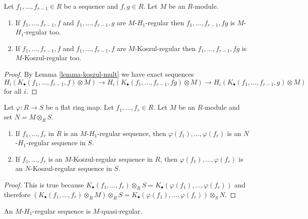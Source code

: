 \begin{lemma}
\label{lemma-mult-koszul-regular}
Let $f_1, \ldots, f_{r - 1} \in R$ be a sequence and $f, g \in R$.
Let $M$ be an $R$-module.
\begin{enumerate}
\item If $f_1, \ldots, f_{r - 1}, f$ and $f_1, \ldots, f_{r - 1}, g$
are $M$-$H_1$-regular then $f_1, \ldots, f_{r - 1}, fg$ is
$M$-$H_1$-regular too.
\item If $f_1, \ldots, f_{r - 1}, f$ and $f_1, \ldots, f_{r - 1}, f$ are
$M$-Koszul-regular then $f_1, \ldots, f_{r - 1}, fg$ is $M$-Koszul-regular
too.
\end{enumerate}
\end{lemma}

\begin{proof}
By
Lemma \ref{lemma-koszul-mult}
we have exact sequences
$$
H_i(K_\bullet(f_1, \ldots, f_{r - 1}, f) \otimes M) \to
H_i(K_\bullet(f_1, \ldots, f_{r - 1}, fg) \otimes M) \to
H_i(K_\bullet(f_1, \ldots, f_{r - 1}, g) \otimes M)
$$
for all $i$.
\end{proof}

\begin{lemma}
\label{lemma-koszul-regular-flat-base-change}
Let $\varphi : R \to S$ be a flat ring map. Let $f_1, \ldots, f_r \in R$.
Let $M$ be an $R$-module and set $N = M \otimes_R S$.
\begin{enumerate}
\item If $f_1, \ldots, f_r$ in $R$ is an $M$-$H_1$-regular sequence, then
$\varphi(f_1), \ldots, \varphi(f_r)$ is an $N$-$H_1$-regular
sequence in $S$.
\item If $f_1, \ldots, f_r$ is an $M$-Koszul-regular sequence in $R$, then
$\varphi(f_1), \ldots, \varphi(f_r)$ is an $N$-Koszul-regular
sequence in $S$.
\end{enumerate}
\end{lemma}

\begin{proof}
This is true because
$K_\bullet(f_1, \ldots, f_r) \otimes_R S =
K_\bullet(\varphi(f_1), \ldots, \varphi(f_r))$
and therefore
$(K_\bullet(f_1, \ldots, f_r) \otimes_R M) \otimes_R S =
K_\bullet(\varphi(f_1), \ldots, \varphi(f_r)) \otimes_S N$.
\end{proof}

\begin{lemma}
\label{lemma-H1-regular-quasi-regular}
An $M$-$H_1$-regular sequence is $M$-quasi-regular.
\end{lemma}

